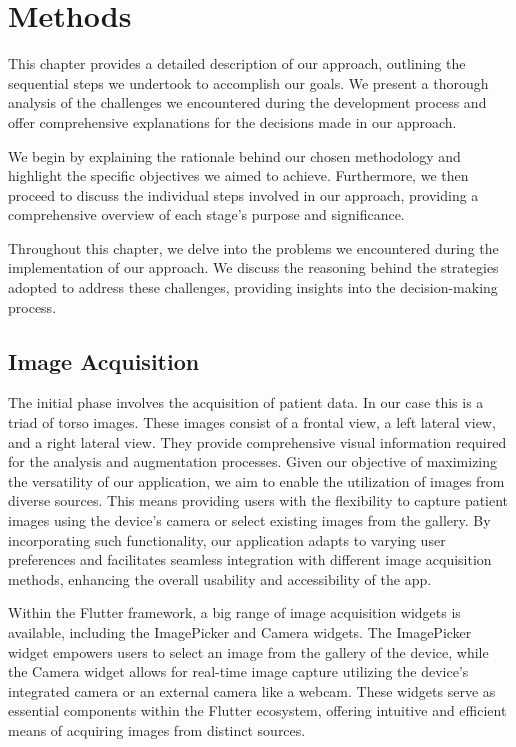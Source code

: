 \chapter{Methods}\label{ch03_methods}

This chapter provides a detailed description of our approach, outlining the sequential steps we undertook to accomplish our goals. We present a thorough analysis of the challenges we encountered during 
the development process and offer comprehensive explanations for the decisions made in our approach.

We begin by explaining the rationale behind our chosen methodology and highlight the specific objectives we aimed to achieve. Furthermore, we then proceed to discuss the individual steps involved in our approach, 
providing a comprehensive overview of each stage's purpose and significance.

Throughout this chapter, we delve into the problems we encountered during the implementation of our approach. We discuss the reasoning behind the strategies adopted to address these challenges, 
providing insights into the decision-making process.

\section{Image Acquisition}

The initial phase involves the acquisition of patient data. In our case this is a triad of torso images. These images consist of a frontal view, a left lateral view, and a right lateral view. 
They provide comprehensive visual information required for the analysis and augmentation processes. Given our objective of maximizing the versatility of our application, 
we aim to enable the utilization of images from diverse sources. This means providing users with the flexibility to capture patient images using the device's camera or select existing images from the gallery. 
By incorporating such functionality, our application adapts to varying user preferences and facilitates seamless integration with different image acquisition methods, 
enhancing the overall usability and accessibility of the app.

Within the Flutter framework, a big range of image acquisition widgets is available, including the ImagePicker and Camera widgets. 
The ImagePicker widget empowers users to select an image from the gallery of the device, while the Camera widget allows for real-time image capture utilizing the device's integrated camera 
or an external camera like a webcam. These widgets serve as essential components within the Flutter ecosystem, offering intuitive and efficient means of acquiring images from distinct sources.

